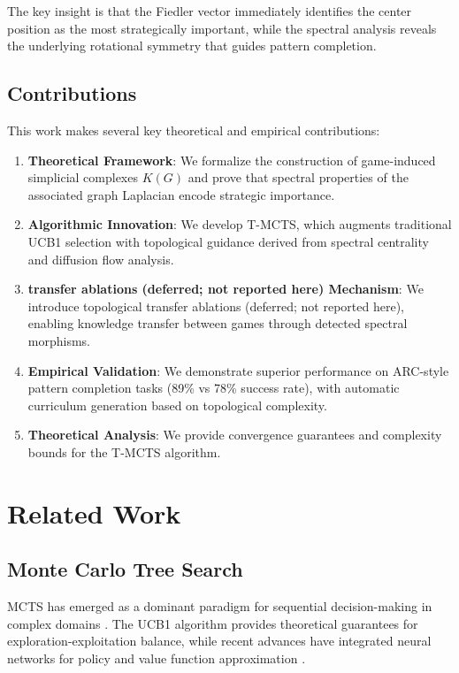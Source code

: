 \documentclass{article}
\begin{document}
The key insight is that the Fiedler vector immediately identifies the center position as the most strategically important, while the spectral analysis reveals the underlying rotational symmetry that guides pattern completion.

\subsection{Contributions}

This work makes several key theoretical and empirical contributions:

\begin{enumerate}
\item \textbf{Theoretical Framework}: We formalize the construction of game-induced simplicial complexes $K(G)$ and prove that spectral properties of the associated graph Laplacian encode strategic importance.

\item \textbf{Algorithmic Innovation}: We develop T-MCTS, which augments traditional UCB1 selection with topological guidance derived from spectral centrality and diffusion flow analysis.

\item \textbf{transfer ablations (deferred; not reported here) Mechanism}: We introduce topological transfer ablations (deferred; not reported here), enabling knowledge transfer between games through detected spectral morphisms.

\item \textbf{Empirical Validation}: We demonstrate superior performance on ARC-style pattern completion tasks (89\% vs 78\% success rate), with automatic curriculum generation based on topological complexity.

\item \textbf{Theoretical Analysis}: We provide convergence guarantees and complexity bounds for the T-MCTS algorithm.
\end{enumerate}

\section{Related Work}

\subsection{Monte Carlo Tree Search}
MCTS has emerged as a dominant paradigm for sequential decision-making in complex domains \citep{browne2012survey}. The UCB1 algorithm \citep{auer2002finite} provides theoretical guarantees for exploration-exploitation balance, while recent advances have integrated neural networks for policy and value function approximation \citep{silver2017mastering}.
\end{document}
